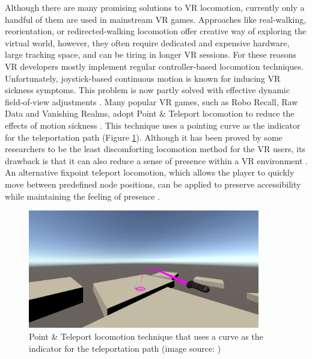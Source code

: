 Although there are many promising solutions to VR locomotion, currently only a handful of them are used in mainstream VR games. Approaches like real-walking, reorientation, or redirected-walking locomotion offer creative way of exploring the virtual world, however, they often require dedicated and expensive hardware, large tracking space, and can be tiring in longer VR sessions. For these reasons VR developers mostly implement regular controller-based locomotion techniques. Unfortunately, joystick-based continuous motion is known for inducing VR sickness symptoms. This problem is now partly solved with effective dynamic field-of-view adjustments \cite{DYNAMICFOD}. Many popular VR games, such as Robo Recall, Raw Data and Vanishing Realms, adopt Point \& Teleport locomotion to reduce the effects of motion sickness \cite{TELEPORTATIONGAMES}. This technique uses a pointing curve as the indicator for the teleportation path (Figure \ref{fig:TELEPORTATIONCURVEIMAGE}). Although it has been proved by some researchers to be the least discomforting locomotion method for the VR users, its drawback is that it can also reduce a sense of presence within a VR environment \cite{TELEPORTATIONEFFECTS}. An alternative fixpoint teleport locomotion, which allows the player to quickly move between predefined node positions, can be applied to preserve accessibility while maintaining the feeling of presence \cite{NODEBASEDTELEPORTATION}.

\begin{figure}[th]
\centering
\includegraphics[width=0.9\textwidth]{img/teleportation_curve.png}
\caption{Point \& Teleport locomotion technique that uses a curve as the indicator for the teleportation path (image source: \cite{TELEPORTATIONCURVE})}
\label{fig:TELEPORTATIONCURVEIMAGE}
\end{figure}

